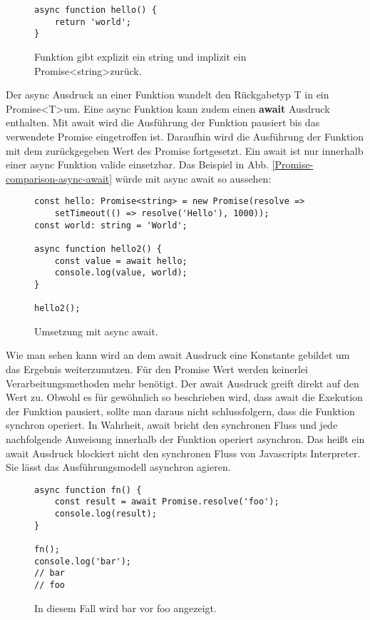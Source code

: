 \begin{figure}[H]
\begin{lstlisting}[basicstyle=\small]
async function hello() {
    return 'world';
}
\end{lstlisting}
\caption{Funktion gibt explizit ein string und implizit ein Promise\textless string\textgreater zurück.}
\end{figure}

\noindent
Der async Ausdruck an einer Funktion wandelt den Rückgabetyp T in ein Promise\textless T\textgreater um. Eine async Funktion kann zudem einen \textbf{await} Ausdruck enthalten. Mit await wird die Ausführung der Funktion pausiert bis das verwendete Promise eingetroffen ist. Daraufhin wird die Ausführung der Funktion mit dem zurückgegeben Wert des Promise fortgesetzt. Ein await ist nur innerhalb einer async Funktion valide einsetzbar. Das Beispiel in Abb. \ref{Promise-comparison-async-await} würde mit async await so aussehen:

\begin{figure}[H]
\begin{lstlisting}[basicstyle=\small]
const hello: Promise<string> = new Promise(resolve =>
    setTimeout(() => resolve('Hello'), 1000));
const world: string = 'World';

async function hello2() {
    const value = await hello;
    console.log(value, world);
}

hello2();
\end{lstlisting}
\caption{Umsetzung mit async await.}
\end{figure}

\noindent
Wie man sehen kann wird an dem await Ausdruck eine Konstante gebildet um das Ergebnis weiterzunutzen. Für den Promise Wert werden keinerlei Verarbeitungsmethoden mehr benötigt. Der await Ausdruck greift direkt auf den Wert zu. Obwohl es für gewöhnlich so beschrieben wird, dass await die Exekution der Funktion pausiert, sollte man daraus nicht schlussfolgern, dass die Funktion synchron operiert. In Wahrheit, await bricht den synchronen Fluss und jede nachfolgende Anweisung innerhalb der Funktion operiert asynchron. Das heißt ein await Ausdruck blockiert nicht den synchronen Fluss von Javascripts Interpreter. Sie lässt das Ausführungsmodell asynchron agieren.

\begin{figure}[H]
\begin{lstlisting}[basicstyle=\small]
async function fn() {
    const result = await Promise.resolve('foo');
    console.log(result);
}

fn();
console.log('bar');
// bar
// foo
\end{lstlisting}
\caption{In diesem Fall wird bar vor foo angezeigt.}
\end{figure}

